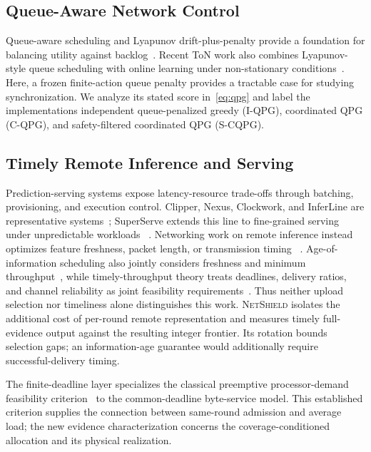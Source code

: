 \documentclass[10pt,journal]{IEEEtran}
\newcommand{\NetShield}{\textsc{NetShield}}
\newcommand{\IQPG}{\textsc{I-QPG}}
\newcommand{\CQPG}{\textsc{C-QPG}}
\newcommand{\SCQPG}{\textsc{S-CQPG}}
\begin{document}
\subsection{Queue-Aware Network Control}
Queue-aware scheduling and Lyapunov drift-plus-penalty provide a foundation
for balancing utility against backlog~\cite{tassiulas1992,neely2010}.
Recent ToN work also combines Lyapunov-style queue scheduling with online
learning under non-stationary conditions~\cite{huang2024lyapunovbandit}.
Here, a frozen finite-action queue penalty provides a tractable case for
studying synchronization. We analyze its stated score in~\eqref{eq:qpg}
and label the implementations independent queue-penalized greedy (\IQPG),
coordinated QPG (\CQPG), and safety-filtered coordinated QPG (\SCQPG).

\subsection{Timely Remote Inference and Serving}
Prediction-serving systems expose latency-resource trade-offs through
batching, provisioning, and execution control. Clipper, Nexus, Clockwork, and
InferLine are representative systems~\cite{crankshaw2017clipper,
shen2019nexus,gujarati2020clockwork,crankshaw2020inferline}; SuperServe
extends this line to fine-grained serving under unpredictable workloads
~\cite{khare2025superserve}. Networking work on remote inference instead
optimizes feature freshness, packet length, or transmission timing
~\cite{shisher2024timely,ari2026goal}. Age-of-information scheduling also
jointly considers freshness and minimum throughput~\cite{kadota2019aoi},
while timely-throughput theory treats deadlines, delivery ratios, and
channel reliability as joint feasibility requirements~\cite{hou2009qos}.
Thus neither upload selection nor timeliness alone distinguishes this work.
\NetShield{} isolates the additional cost of per-round remote representation
and measures timely full-evidence output against the resulting integer
frontier. Its rotation bounds selection gaps; an information-age guarantee
would additionally require successful-delivery timing.

The finite-deadline layer specializes the classical preemptive
processor-demand feasibility criterion~\cite{baruah1990feasibility} to the
common-deadline byte-service model. This established criterion supplies the
connection between same-round admission and average load; the new evidence
characterization concerns the coverage-conditioned allocation and its
physical realization.
\end{document}
